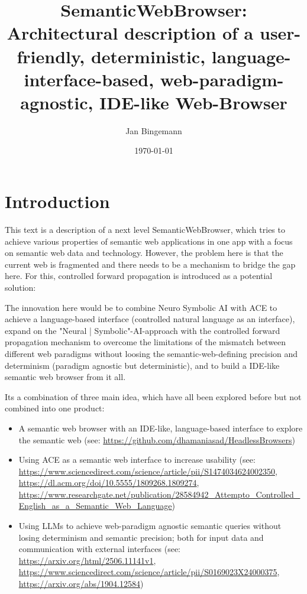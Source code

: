 \documentclass[12pt,a4paper]{article}
\title{SemanticWebBrowser:\\Architectural description of a user-friendly, deterministic, language-interface-based, web-paradigm-agnostic, IDE-like Web-Browser}
\author{Jan Bingemann}
\date{\today}
\begin{document}
\maketitle

\tableofcontents
\newpage

\section{Introduction}

This text is a description of a next level SemanticWebBrowser, which tries to achieve various properties of semantic web applications in one app with a focus on semantic web data and technology. However, the problem here is that the current web is fragmented and there needs to be a mechanism to bridge the gap here. For this, controlled forward propagation is introduced as a potential solution:

The innovation here would be to combine Neuro Symbolic AI with ACE to achieve a language-based interface (controlled natural language as an interface), expand on the "Neural | Symbolic"-AI-approach with the controlled forward propagation mechanism to overcome the limitations of the mismatch between different web paradigms without loosing the semantic-web-defining precision and determinism (paradigm agnostic but deterministic), and to build a IDE-like semantic web browser from it all.

Its a combination of three main idea, which have all been explored before but not combined into one product:

\begin{itemize}
    \item A semantic web browser with an IDE-like, language-based interface to explore the semantic web (see: \url{https://github.com/dhamaniasad/HeadlessBrowsers})
    \item Using ACE as a semantic web interface to increase usability (see: \url{https://www.sciencedirect.com/science/article/pii/S1474034624002350}, \url{https://dl.acm.org/doi/10.5555/1809268.1809274}, \url{https://www.researchgate.net/publication/28584942_Attempto_Controlled_English_as_a_Semantic_Web_Language})
    \item Using LLMs to achieve web-paradigm agnostic semantic queries without losing determinism and semantic precision; both for input data and communication with external interfaces (see: \url{https://arxiv.org/html/2506.11141v1}, \url{https://www.sciencedirect.com/science/article/pii/S0169023X24000375}, \url{https://arxiv.org/abs/1904.12584})
\end{itemize}
\end{document}
